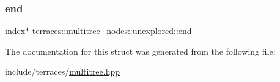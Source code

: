 \subsubsection{\texorpdfstring{end}{end}}
{\footnotesize\ttfamily \hyperlink{namespaceterraces_adbc33ccb543d1634e96d0eb02e472c77}{index}$\ast$ terraces\+::multitree\+\_\+nodes\+::unexplored\+::end}



The documentation for this struct was generated from the following file\+:\begin{DoxyCompactItemize}
\item 
include/terraces/\hyperlink{multitree_8hpp}{multitree.\+hpp}\end{DoxyCompactItemize}
